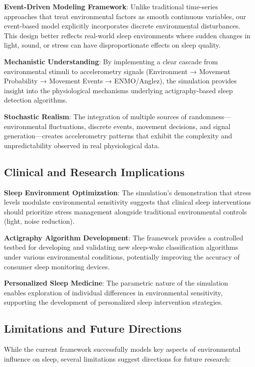 \documentclass[conference]{IEEEtran}
\begin{document}
\textbf{Event-Driven Modeling Framework}: Unlike traditional time-series approaches that treat environmental factors as smooth continuous variables, our event-based model explicitly incorporates discrete environmental disturbances. This design better reflects real-world sleep environments where sudden changes in light, sound, or stress can have disproportionate effects on sleep quality.

\textbf{Mechanistic Understanding}: By implementing a clear cascade from environmental stimuli to accelerometry signals (Environment → Movement Probability → Movement Events → ENMO/Anglez), the simulation provides insight into the physiological mechanisms underlying actigraphy-based sleep detection algorithms.

\textbf{Stochastic Realism}: The integration of multiple sources of randomness—environmental fluctuations, discrete events, movement decisions, and signal generation—creates accelerometry patterns that exhibit the complexity and unpredictability observed in real physiological data.

\subsection{Clinical and Research Implications}

\textbf{Sleep Environment Optimization}: The simulation's demonstration that stress levels modulate environmental sensitivity suggests that clinical sleep interventions should prioritize stress management alongside traditional environmental controls (light, noise reduction).

\textbf{Actigraphy Algorithm Development}: The framework provides a controlled testbed for developing and validating new sleep-wake classification algorithms under various environmental conditions, potentially improving the accuracy of consumer sleep monitoring devices.

\textbf{Personalized Sleep Medicine}: The parametric nature of the simulation enables exploration of individual differences in environmental sensitivity, supporting the development of personalized sleep intervention strategies.

\subsection{Limitations and Future Directions}

While the current framework successfully models key aspects of environmental influence on sleep, several limitations suggest directions for future research:
\end{document}
